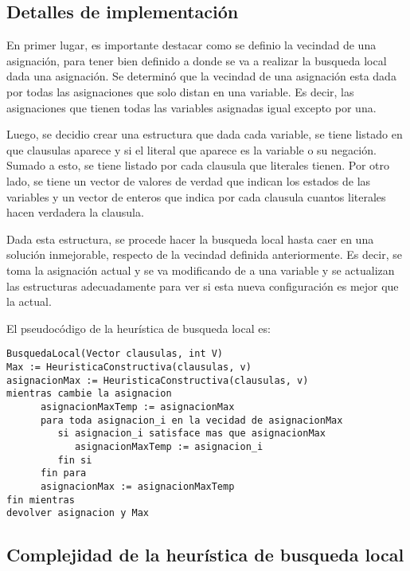 \documentclass[a4paper,10pt]{article}
\begin{document}
\subsection*{Detalles de implementaci\'on}

En primer lugar, es importante destacar como se definio la vecindad de una asignaci\'on, para tener bien definido a donde se va a realizar la busqueda local dada una asignaci\'on. Se determin\'o que la vecindad de una asignaci\'on esta dada por todas las asignaciones que solo distan en una variable. Es decir, las asignaciones que tienen todas las variables asignadas igual excepto por una.

Luego, se decidio crear una estructura que dada cada variable, se tiene listado en que clausulas aparece y si el literal que aparece es la variable o su negaci\'on. Sumado a esto, se tiene listado por cada clausula que literales tienen. Por otro lado, se tiene un vector de valores de verdad que indican los estados de las variables y un vector de enteros que indica por cada clausula cuantos literales hacen verdadera la clausula.

Dada esta estructura, se procede hacer la busqueda local hasta caer en una soluci\'on inmejorable, respecto de la vecindad definida anteriormente. Es decir, se toma la asignaci\'on actual y se va modificando de a una variable y se actualizan las estructuras adecuadamente para ver si esta nueva configuraci\'on es mejor que la actual. 

El pseudoc\'odigo de la heur\'istica de busqueda local es:

\begin{verbatim}
BusquedaLocal(Vector clausulas, int V)
Max := HeuristicaConstructiva(clausulas, v)
asignacionMax := HeuristicaConstructiva(clausulas, v)
mientras cambie la asignacion
      asignacionMaxTemp := asignacionMax
      para toda asignacion_i en la vecidad de asignacionMax
         si asignacion_i satisface mas que asignacionMax
            asignacionMaxTemp := asignacion_i
         fin si
      fin para
      asignacionMax := asignacionMaxTemp
fin mientras
devolver asignacion y Max
\end{verbatim}

\subsection*{Complejidad de la heur\'istica de busqueda local}
\end{document}

